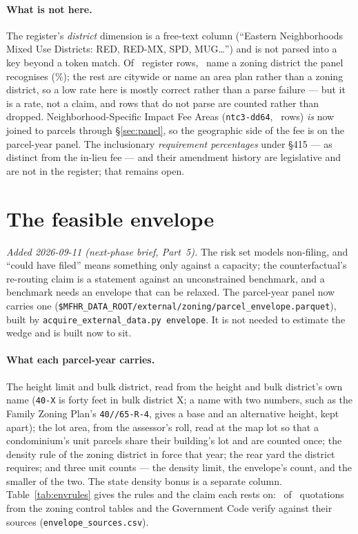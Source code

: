 \documentclass[11pt]{article}
\begin{document}
\paragraph{What is not here.} The register's \emph{district} dimension is a free-text column
(``Eastern Neighborhoods Mixed Use Districts: RED, RED-MX, SPD, MUG\ldots'') and is not parsed
into a key beyond a token match. Of \acqFeeDistrictRows\ register rows,
\acqFeeDistrictKnown\ name a zoning district the panel recognises
(\acqFeeDistrictShare\%); the rest are citywide or name an area plan rather than a zoning
district, so a low rate here is mostly correct rather than a parse failure --- but it is a
rate, not a claim, and rows that do not parse are counted rather than dropped.
Neighborhood-Specific Impact Fee Areas (\texttt{ntc3-dd64}, \acqFeeAreaRows\ rows) \emph{is}
now joined to parcels through \S\ref{sec:panel}, so the geographic side of the fee is on the
parcel-year panel. The inclusionary \emph{requirement percentages} under \S415 --- as distinct
from the in-lieu fee --- and their amendment history are legislative and are not in the
register; that remains open.

\section{The feasible envelope}
\label{sec:envelope}

\emph{Added 2026-09-11 (next-phase brief, Part~5).} The risk set models non-filing, and ``could
have filed'' means something only against a capacity; the counterfactual's re-routing claim is a
statement against an unconstrained benchmark, and a benchmark needs an envelope that can be
relaxed. The parcel-year panel now carries one
(\texttt{\$MFHR\_DATA\_ROOT/}\allowbreak\texttt{external/zoning/parcel\_envelope.parquet}), built by
\texttt{acquire\_external\_data.py envelope}. It is not needed to estimate the wedge and is
built now to sit.

\paragraph{What each parcel-year carries.} The height limit and bulk district, read from the
height and bulk district's own name (\texttt{40-X} is forty feet in bulk district X; a name with
two numbers, such as the Family Zoning Plan's \texttt{40//65-R-4}, gives a base and an
alternative height, kept apart); the lot area, from the assessor's roll, read at the map lot so
that a condominium's unit parcels share their building's lot and are counted once; the density
rule of the zoning district in force that year; the rear yard the district requires; and three
unit counts --- the density limit, the envelope's count, and the smaller of the two. The state
density bonus is a separate column. Table~\ref{tab:envrules} gives the rules and the claim each
rests on: \envClaimsOk\ of \envClaims\ quotations from the zoning control tables and the
Government Code verify against their sources (\texttt{envelope\_sources.csv}).
\end{document}
